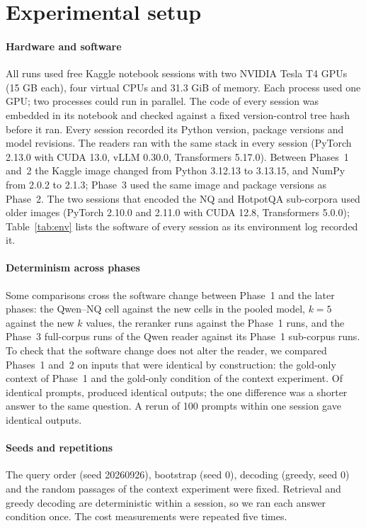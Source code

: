 \section{Experimental setup}\label{sec:setup}

\paragraph{Hardware and software}
All runs used free Kaggle notebook sessions with two NVIDIA Tesla T4 GPUs (15 GB each), four virtual CPUs and 31.3 GiB of memory. Each process used one GPU; two processes could run in parallel. The code of every session was embedded in its notebook and checked against a fixed version-control tree hash before it ran. Every session recorded its Python version, package versions and model revisions. The readers ran with the same stack in every session (PyTorch 2.13.0 with CUDA 13.0, vLLM 0.30.0, Transformers 5.17.0). Between Phases~1 and~2 the Kaggle image changed from Python 3.12.13 to 3.13.15, and NumPy from 2.0.2 to 2.1.3; Phase~3 used the same image and package versions as Phase~2. The two sessions that encoded the NQ and HotpotQA sub-corpora used older images (PyTorch 2.10.0 and 2.11.0 with CUDA 12.8, Transformers 5.0.0); Table~\ref{tab:env} lists the software of every session as its environment log recorded it.

\paragraph{Determinism across phases}
Some comparisons cross the software change between Phase~1 and the later phases: the Qwen--NQ cell against the new cells in the pooled model, $k=5$ against the new $k$ values, the reranker runs against the Phase~1 runs, and the Phase~3 full-corpus runs of the Qwen reader against its Phase~1 sub-corpus runs. To check that the software change does not alter the reader, we compared Phases~1 and~2 on inputs that were identical by construction: the gold-only context of Phase~1 and the gold-only condition of the context experiment. Of  identical prompts,  produced identical outputs; the one difference was a shorter answer to the same question. A rerun of 100 prompts within one session gave  identical outputs.

\paragraph{Seeds and repetitions}
The query order (seed 20260926), bootstrap (seed 0), decoding (greedy, seed 0) and the random passages of the context experiment were fixed. Retrieval and greedy decoding are deterministic within a session, so we ran each answer condition once. The cost measurements were repeated five times.

